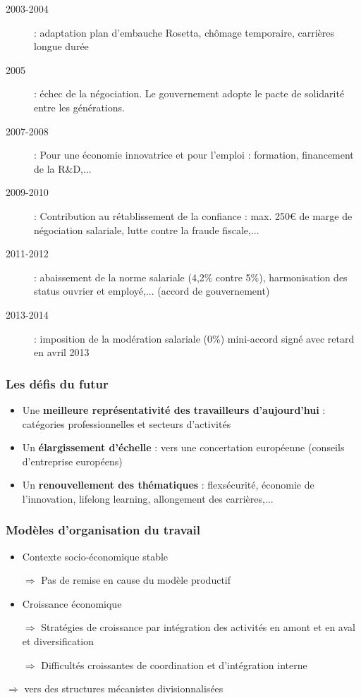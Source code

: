 \documentclass[12pt]{beamer}
\begin{document}
  \begin{frame}
    \begin{description}
     \item[2003-2004] : adaptation plan d'embauche Rosetta, chômage temporaire, carrières longue durée
     \item[2005] : échec de la négociation. Le gouvernement adopte le pacte de solidarité entre les générations.
     \item[2007-2008] : Pour une économie innovatrice et pour l'emploi : formation, financement de la R\&D,...
     \item[2009-2010] : Contribution au rétablissement de la confiance : max. 250\euro{} de marge de négociation salariale, lutte contre la fraude fiscale,...
     \item[2011-2012] : abaissement de la norme salariale (4,2\% contre 5\%), harmonisation des status ouvrier et employé,... (accord de gouvernement)
     \item[2013-2014] : imposition de la modération salariale (0\%) \og{} mini-accord \fg{} signé avec retard en avril 2013
    \end{description}
  \end{frame}
  
  \begin{frame}
    \frametitle{Les défis du futur}
    
    \begin{itemize}
     \item Une \textbf{meilleure représentativité des travailleurs d'aujourd'hui} : catégories professionnelles et secteurs d'activités
     \item Un \textbf{élargissement d'échelle} : vers une concertation européenne (conseils d'entreprise européens)
     \item Un \textbf{renouvellement des thématiques} : flexsécurité, économie de l'innovation, lifelong learning, allongement des carrières,...
    \end{itemize}
    
  \end{frame}
  
  \begin{frame}
    \frametitle{Modèles d'organisation du travail}
    
    \begin{itemize}
     \item Contexte socio-économique stable
     
	 \subitem $\Rightarrow$ Pas de remise en cause du modèle productif
	 
     \item Croissance économique
     
	 \subitem $\Rightarrow$ Stratégies de croissance par intégration des activités en amont et en aval et diversification
	 
	 \subitem $\Rightarrow$ Difficultés croissantes de coordination et d'intégration interne

    \end{itemize}
    
    $\Rightarrow$ vers des structures mécanistes divisionnalisées
    
  \end{frame}
  
\end{document}
